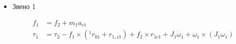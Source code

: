 \documentclass[a4paper,14pt]{extreport}
\begin{document}
\begin{itemize}
\begin{align*}
\begin{bmatrix}
m_2 sin(q_2) ) (-g sin(q_1) - l_1 \ddot q_1^2) - m_2 cos(q_2) (g cos(q_1) + l_1 \ddot q_1)\\
0
\end{bmatrix}
\right.
+\\
&+
\left.
\begin{bmatrix}
m_2 r_2 (\dot q_1 + \dot q_2)^2 + m_2 r_2(\dot q_1 + \dot q_2)^2\\
m_2 r_2 (\ddot q_1 + \ddot q_2) - m_2 r_2(\ddot q_1 + \ddot q_2)\\
0
\end{bmatrix}
\right) \times
\begin{bmatrix}
l_2 - r_2\\
0\\
0
\end{bmatrix}
+\\
&+
\begin{bmatrix}
0\\
0\\
(\ddot q_1 + \ddot q_2)\frac{m_i (3 r_{link_i}^2 + l_i^2)}{2} + m_i r_i^2
\end{bmatrix}
\end{align*}

	\item Звено 1
	
	\begin{align*}
		f_1 &= f_2 + m_1 a_{c1}\\
		\tau_1 &= \tau_2 - f_1 \times (^1 r_{01} + r_{1,c1}) + f_2 \times r_{1c1} + J_1 \dot \omega_1 + \omega_1 \times (J_1 \omega_1)
	\end{align*}


\end{itemize}



\subsection{}
\end{document}
